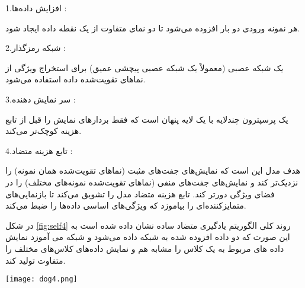 1.افزایش داده‌ها : 

هر نمونه ورودی دو بار افزوده می‌شود تا دو نمای متفاوت از یک نقطه داده ایجاد شود.

2.شبکه رمزگذار  : 

یک شبکه عصبی (معمولاً یک شبکه عصبی پیچشی عمیق) برای استخراج ویژگی از نماهای تقویت‌شده داده استفاده می‌شود.

3.سر نمایش دهنده   :

یک پرسپترون چندلایه  با یک لایه پنهان است که فقط بردارهای نمایش را قبل از تابع هزینه کوچک‌تر می‌کند.

4.تابع هزینه متضاد : 

هدف مدل این است که نمایش‌های جفت‌های مثبت (نماهای تقویت‌شده همان نمونه) را نزدیک‌تر کند و نمایش‌های جفت‌های منفی (نماهای تقویت‌شده نمونه‌های مختلف) را در فضای ویژگی دورتر کند. تابع هزینه متضاد مدل را تشویق می‌کند تا بازنمایی‌های متمایزکننده‌ای را بیاموزد که ویژگی‌های اساسی داده‌ها را ضبط می‌کند.

در شکل  \ref{fig:self4}  روند کلی الگوریتم یادگیری متضاد ساده نشان داده شده است به این صورت که دو داده افزوده شده به شبکه داده می‌شود و شبکه می آموزد نمایش داده های مربوط به یک کلاس را مشابه هم و نمایش داده‌های کلاس‌های مختلف را متفاوت تولید کند.

\begin{minipage}{\linewidth}
	\centering
	\texttt{[image: dog4.png]}
	\captionsetup{font=small} %
	\label{fig:self4}
\end{minipage}

%

